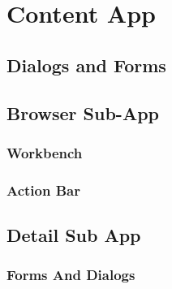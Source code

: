 \section{Content App}
\subsection{Dialogs and Forms}

\subsection{Browser Sub-App}
\subsubsection{Workbench}
\subsubsection{Action Bar}

\subsection{Detail Sub App}
\subsubsection{Forms And Dialogs}